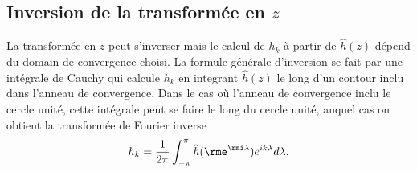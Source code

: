 \subsection{Inversion de la transformée en $z$}
%
%
%
%
%
La transform\'ee en $z$ peut s'inverser mais le calcul de
$h_k$ \`a partir de $\hat h (z)$ d\'epend du domain de
convergence choisi. La formule g\'en\'erale d'inversion se
fait par une int\'egrale de Cauchy qui calcule $h_k$
en integrant $\hat h (z)$ le long d'un contour inclu
dans l'anneau de convergence.
Dans le cas o\`u l'anneau de convergence
inclu le cercle unit\'e, cette int\'egrale peut se faire le
long du cercle unit\'e, auquel cas on obtient la transform\'ee
de Fourier inverse
\[
h_k = \frac 1 {2 \pi} \int_{-\pi}^{\pi}
\hat h ({\rme^{\rmi \lambda}}) e^{i k \lambda} d\lambda .
\]

